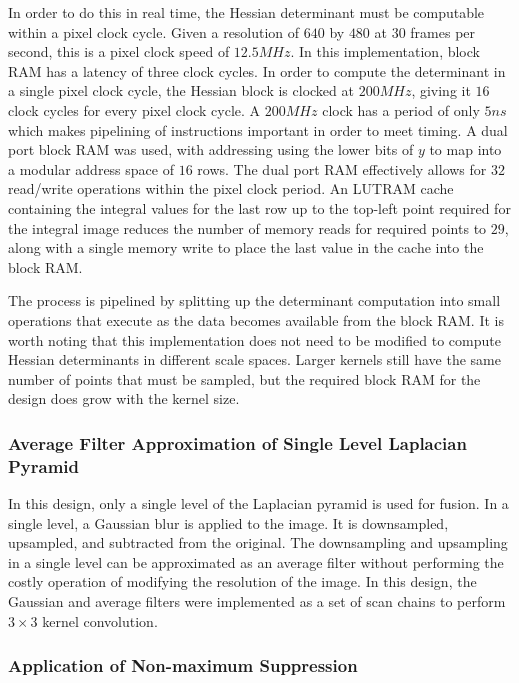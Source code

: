 \documentclass[sigconf]{acmart}
\begin{document}
In order to do this in real time, the Hessian determinant must be computable within a pixel clock cycle. Given a resolution of $640$ by $480$ at $30$ frames per second, this is a pixel clock speed of $12.5 MHz$. In this implementation, block RAM has a latency of three clock cycles. In order to compute the determinant in a single pixel clock cycle, the Hessian block is clocked at $200 MHz$, giving it $16$ clock cycles for every pixel clock cycle. A $200 MHz$ clock has a period of only $5ns$ which makes pipelining of instructions important in order to meet timing. A dual port block RAM was used, with addressing using the lower bits of $y$ to map into a modular address space of $16$ rows. The dual port RAM effectively allows for $32$ read/write operations within the pixel clock period. An LUTRAM cache containing the integral values for the last row up to the top-left point required for the integral image reduces the number of memory reads for required points to $29$, along with a single memory write to place the last value in the cache into the block RAM. 

The process is pipelined by splitting up the determinant computation into small operations that execute as the data becomes available from the block RAM. It is worth noting that this implementation does not need to be modified to compute Hessian determinants in different scale spaces. Larger kernels still have the same number of points that must be sampled, but the required block RAM for the design does grow with the kernel size.

\subsubsection{Average Filter Approximation of Single Level Laplacian Pyramid}

In this design, only a single level of the Laplacian pyramid is used for fusion. In a single level, a Gaussian blur is applied to the image. It is downsampled, upsampled, and subtracted from the original. The downsampling and upsampling in a single level can be approximated as an average filter without performing the costly operation of modifying the resolution of the image. In this design, the Gaussian and average filters were implemented as a set of scan chains to perform $3 \times 3$ kernel convolution.

\subsubsection{Application of Non-maximum Suppression}
\end{document}
